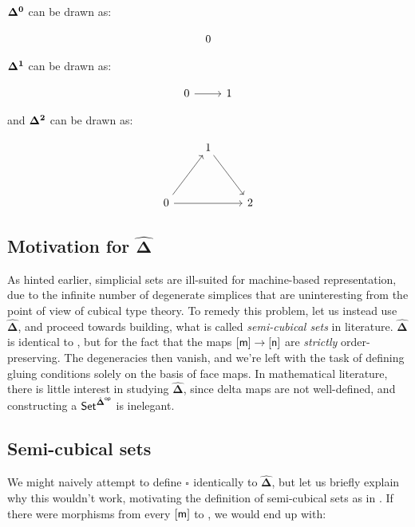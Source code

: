 \documentclass[10pt]{art}
\newcommand{\DeltaHat}{\ensuremath{\hat{\boldsymbol{\Delta}}}}
\newcommand{\Cube}[1]{\ensuremath{\boldsymbol{\square^{#1}}}}
\begin{document}
\begin{example}
  $\boldsymbol{\Delta^{0}}$ can be drawn as:

  $$
    \begin{tikzcd}
      0
    \end{tikzcd}
  $$

  $\boldsymbol{\Delta^{1}}$ can be drawn as:

  $$
    \begin{tikzcd}
      0 \arrow[r] & 1
    \end{tikzcd}
  $$

  and $\boldsymbol{\Delta^{2}}$ can be drawn as:

  $$
    \begin{tikzcd}
      & 1 \arrow[ddr] & \\
      \\
      0 \arrow[uur] \arrow[rr] & & 2
    \end{tikzcd}
  $$
\end{example}

\subsection{Motivation for \texorpdfstring{\DeltaHat}{delta sets}}
As hinted earlier, simplicial sets are ill-suited for machine-based representation, due to the infinite number of degenerate simplices that are uninteresting from the point of view of cubical type theory. To remedy this problem, let us instead use \DeltaHat, and proceed towards building, what is called \emph{semi-cubical sets} in literature. $\DeltaHat$ is identical to \Simplex{}, but for the fact that the maps $\mathsf{[m]} \rightarrow \mathsf{[n]}$ are \emph{strictly} order-preserving. The degeneracies then vanish, and we're left with the task of defining gluing conditions solely on the basis of face maps. In mathematical literature, there is little interest in studying \DeltaHat, since delta maps are not well-defined, and constructing a $\Set^{\op{\DeltaHat}}$ is inelegant.

\subsection{Semi-cubical sets}
We might naively attempt to define $\Cube{}$ identically to \DeltaHat, but let us briefly explain why this wouldn't work, motivating the definition of semi-cubical sets as in \cite{Antolini00}. If there were morphisms from every $\mathsf{[m]}$ to , we would end up with:
\end{document}
